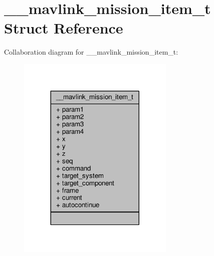 \hypertarget{struct____mavlink__mission__item__t}{\section{\+\_\+\+\_\+mavlink\+\_\+mission\+\_\+item\+\_\+t Struct Reference}
\label{struct____mavlink__mission__item__t}
}


Collaboration diagram for \+\_\+\+\_\+mavlink\+\_\+mission\+\_\+item\+\_\+t\+:
\nopagebreak
\begin{figure}[H]
\begin{center}
\leavevmode
\includegraphics[width=212pt]{struct____mavlink__mission__item__t__coll__graph}
\end{center}
\end{figure}
